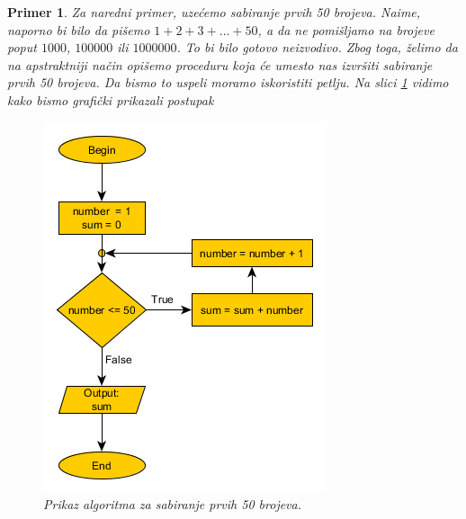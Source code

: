 \documentclass[a4paper]{article}
\newtheorem{primer}{Primer}[section]
\begin{document}
\begin{primer}
Za naredni primer, uzećemo sabiranje prvih 50 brojeva. Naime, naporno bi bilo da pišemo $1+2+3+...+50$, a da ne pomišljamo na brojeve poput $1000$, $100 000$ ili $1 000 000$. To bi bilo gotovo neizvodivo. Zbog toga, želimo da na apstraktniji način opišemo proceduru koja će umesto nas izvršiti sabiranje prvih 50 brojeva. Da bismo to uspeli moramo iskoristiti petlju. Na slici \ref{fig:alg2} vidimo kako bismo grafički prikazali postupak
\begin{figure}[h!]
\begin{center}
\includegraphics[scale=0.5]{pictures/algorithm-flow.png}
\end{center}
\caption{Prikaz algoritma za sabiranje prvih 50 brojeva.}
\label{fig:alg2}
\end{figure}
\end{primer}
\end{document}
